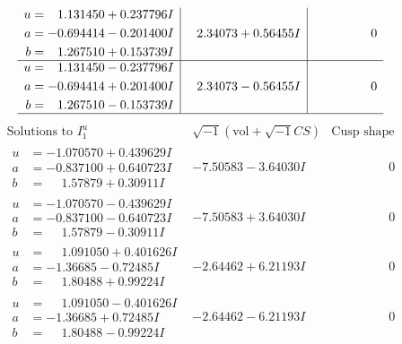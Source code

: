 \documentclass[1p]{elsarticle_modified}
\theoremstyle{definition}
\newcommand{\I}{\sqrt{-1}}
\begin{document}
$$\begin{array}{c|c|c}
\begin{aligned}
u &= \phantom{-}1.131450 + 0.237796 I \\
a &= -0.694414 - 0.201400 I \\
b &= \phantom{-}1.267510 + 0.153739 I\end{aligned}
 & \phantom{-}2.34073 + 0.56455 I & \phantom{-0.000000 } 0 \\ \hline\begin{aligned}
u &= \phantom{-}1.131450 - 0.237796 I \\
a &= -0.694414 + 0.201400 I \\
b &= \phantom{-}1.267510 - 0.153739 I\end{aligned}
 & \phantom{-}2.34073 - 0.56455 I & \phantom{-0.000000 } 0\\
 \hline 
 \end{array}$$\newpage$$\begin{array}{c|c|c}  
\text{Solutions to }I^u_{1}& \I (\text{vol} + \sqrt{-1}CS) & \text{Cusp shape}\\
 \hline 
\begin{aligned}
u &= -1.070570 + 0.439629 I \\
a &= -0.837100 + 0.640723 I \\
b &= \phantom{-}1.57879 + 0.30911 I\end{aligned}
 & -7.50583 - 3.64030 I & \phantom{-0.000000 } 0 \\ \hline\begin{aligned}
u &= -1.070570 - 0.439629 I \\
a &= -0.837100 - 0.640723 I \\
b &= \phantom{-}1.57879 - 0.30911 I\end{aligned}
 & -7.50583 + 3.64030 I & \phantom{-0.000000 } 0 \\ \hline\begin{aligned}
u &= \phantom{-}1.091050 + 0.401626 I \\
a &= -1.36685 - 0.72485 I \\
b &= \phantom{-}1.80488 + 0.99224 I\end{aligned}
 & -2.64462 + 6.21193 I & \phantom{-0.000000 } 0 \\ \hline\begin{aligned}
u &= \phantom{-}1.091050 - 0.401626 I \\
a &= -1.36685 + 0.72485 I \\
b &= \phantom{-}1.80488 - 0.99224 I\end{aligned}
 & -2.64462 - 6.21193 I & \phantom{-0.000000 } 0 \\ \hline\begin{aligned}

\end{aligned}
\end{array}$$
\end{document}
